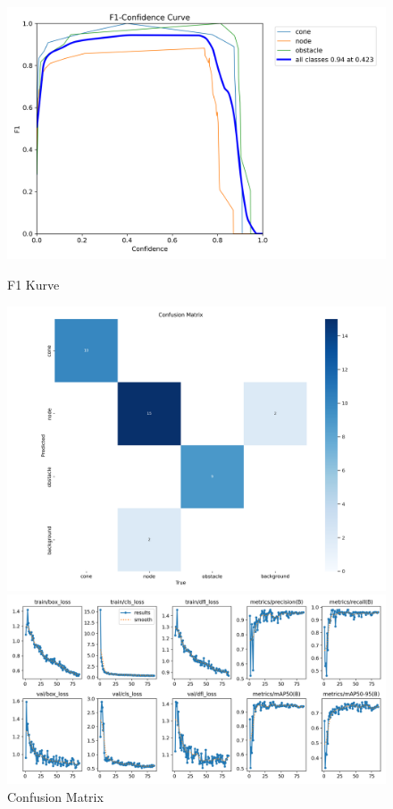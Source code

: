 \begin{figure}[H]
  \centering
    \begin{minipage}[b]{0.3\textwidth}
    \centering
    \includegraphics[width=\textwidth]{assets/IT/yolo/F1_curve.png}
    \caption{F1 Kurve}
    \label{fig:f1}
  \end{minipage}
  \hfill
  \begin{minipage}[b]{0.3\textwidth}
    \centering
    \includegraphics[width=\textwidth]{assets/IT/yolo/confusion_matrix.png}
    \caption{Confusion Matrix}
    \label{fig:conf-matrix}
  \end{minipage}
    \hfill
  \begin{minipage}[b]{0.3\textwidth}
    \centering
    \includegraphics[width=\textwidth]{assets/IT/yolo/results.png}

\end{minipage}
\end{figure}
